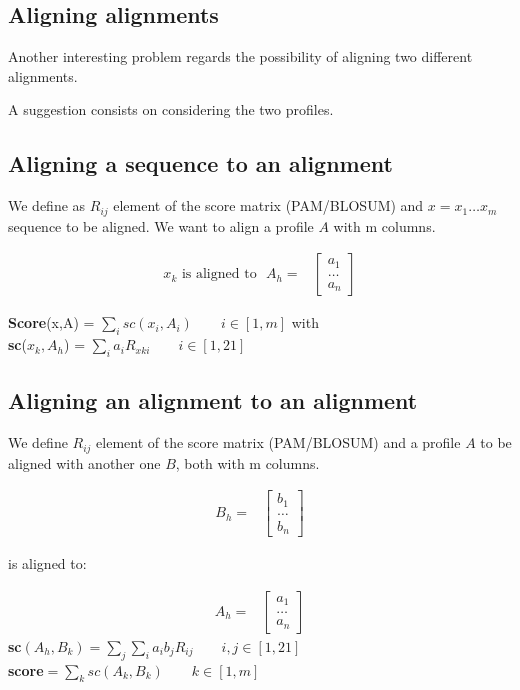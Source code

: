 \subsection{Aligning alignments}
Another interesting problem regards the possibility of aligning two different alignments.


A suggestion consists on considering the two profiles.

\subsection{Aligning a sequence to an alignment}
We define as $R_{ij}$ element of the score matrix (PAM/BLOSUM) and $x = x_1 \dots x_m$ sequence to be aligned. We want to align a profile $A$ with m columns.

\begin{align}
x_k \text{~is~aligned to}~~~ A_h = & \begin{bmatrix}
a_1 \\
\dots \\
a_n
\end{bmatrix}
\end{align}

\textbf{Score}(x,A) = $\sum_isc(x_i,A_i)\qquad i \in [1,m]$ with\\
\textbf{sc}($x_k, A_h$) = $\sum_ia_iR_{xki} \qquad i \in [1,21]$

\subsection{Aligning an alignment to an alignment}
We define $R_{ij}$ element of the score matrix (PAM/BLOSUM) and a profile $A$ to be aligned with another one $B$, both with m columns.

\begin{align}
B_h = & \begin{bmatrix}
b_1 \\
\dots \\
b_n
\end{bmatrix}
\end{align}

is aligned to:

\begin{align}
A_h = & \begin{bmatrix}
a_1 \\
\dots \\
a_n
\end{bmatrix}
\end{align}
\textbf{sc}$(A_h,B_k) = \sum_j\sum_ia_ib_jR_{ij} \qquad i,j \in [1,21]$\\
\textbf{score}$= \sum_k sc(A_k, B_k) \qquad k \in [1,m]$

